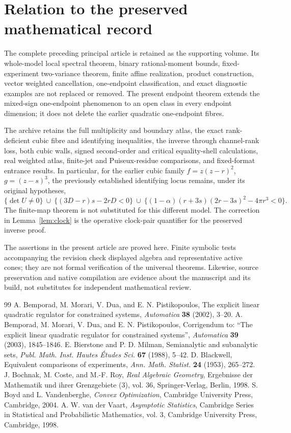 \section{Relation to the preserved mathematical record}\label{app:record}
The complete preceding principal article is retained as the supporting volume. Its whole-model local spectral theorem, binary rational-moment bounds, fixed-experiment two-variance theorem, finite affine realization, product construction, vector weighted cancellation, one-endpoint classification, and exact diagnostic examples are not replaced or removed. The present endpoint theorem extends the mixed-sign one-endpoint phenomenon to an open class in every endpoint dimension; it does not delete the earlier quadratic one-endpoint fibres.

The archive retains the full multiplicity and boundary atlas, the exact rank-deficient cubic fibre and identifying inequalities, the inverse through channel-rank loss, both cubic walls, signed second-order and critical equality-shell calculations, real weighted atlas, finite-jet and Puiseux-residue comparisons, and fixed-format entrance results. In particular, for the earlier cubic family $f=z(z-r)^2$, $g=(z-s)^3$, the previously established identifying locus remains, under its original hypotheses,
\[
 \{\det U\ne0\}\ \cup\ \{(3D-r)s-2rD<0\}\ \cup\
 \{(1-\alpha)(r+3s)(2r-3s)^2-4\pi r^3<0\}.
\]
The finite-map theorem is not substituted for this different model. The correction in Lemma~\ref{lem:clock} is the operative clock-pair quantifier for the preserved inverse proof.

The assertions in the present article are proved here. Finite symbolic tests accompanying the revision check displayed algebra and representative active cones; they are not formal verification of the universal theorems. Likewise, source preservation and native compilation are evidence about the manuscript and its build, not substitutes for independent mathematical review.

\begin{thebibliography}{99}
 A. Bemporad, M. Morari, V. Dua, and E. N. Pistikopoulos,
The explicit linear quadratic regulator for constrained systems,
\emph{Automatica} \textbf{38} (2002), 3--20.
 A. Bemporad, M. Morari, V. Dua, and E. N. Pistikopoulos,
Corrigendum to: ``The explicit linear quadratic regulator for constrained systems'',
\emph{Automatica} \textbf{39} (2003), 1845--1846.
 E. Bierstone and P. D. Milman,
Semianalytic and subanalytic sets,
\emph{Publ. Math. Inst. Hautes \'Etudes Sci.} \textbf{67} (1988), 5--42.
\bibitem{Blackwell} D. Blackwell,
Equivalent comparisons of experiments,
\emph{Ann. Math. Statist.} \textbf{24} (1953), 265--272.
 J. Bochnak, M. Coste, and M.-F. Roy,
\emph{Real Algebraic Geometry}, Ergebnisse der Mathematik und ihrer Grenzgebiete (3), vol. 36, Springer-Verlag, Berlin, 1998.
\bibitem{BV} S. Boyd and L. Vandenberghe,
\emph{Convex Optimization}, Cambridge University Press, Cambridge, 2004.
\bibitem{vdV} A. W. van der Vaart,
\emph{Asymptotic Statistics}, Cambridge Series in Statistical and Probabilistic Mathematics, vol. 3, Cambridge University Press, Cambridge, 1998.
\end{thebibliography}

